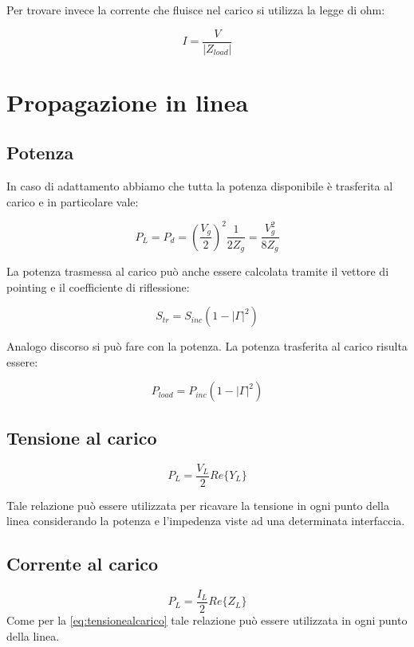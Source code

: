 \documentclass[10pt,a4paper]{report}
\begin{document}
	Per trovare invece la corrente che fluisce nel carico si utilizza la legge di ohm:

	\[
	I=\frac{V}{|Z_{load}|}
	\]

\chapter{Propagazione in linea}



	\section{Potenza}
		In caso di adattamento abbiamo che tutta la potenza disponibile è trasferita al carico e in particolare vale:
			
			\begin{equation}
			P_L=P_d=(\frac{V_g}{2})^2\frac{1}{2Z_g}=\frac{V_g^2}{8Z_g}
			\end{equation}

			La potenza trasmessa al carico può anche essere calcolata tramite il vettore di pointing e il coefficiente di riflessione:

			\begin{equation}
			S_{tr}=S_{inc}(1-|\Gamma|^2)
			\end{equation}

			Analogo discorso si può fare con la potenza.
			La potenza trasferita al carico risulta essere:

			\begin{equation}
			P_{load}=P_{inc}(1-|\Gamma|^2)
			\end{equation}
	\section{Tensione al carico}

			\begin{equation}
			P_L=\frac{V_{L}}{2}Re\{Y_L\}
			\label{eq:tensionealcarico}
			\end{equation}

			Tale relazione può essere utilizzata per ricavare la tensione in ogni punto della linea considerando la potenza e l'impedenza viste ad una determinata interfaccia.
	\section{Corrente al carico}


			\begin{equation}
			P_L=\frac{I_{L}}{2}Re\{Z_L\}
			\label{eq:correntealcarico}
			\end{equation}
			Come per la \ref{eq:tensionealcarico} tale relazione può essere utilizzata in ogni punto della linea.
\end{document}
